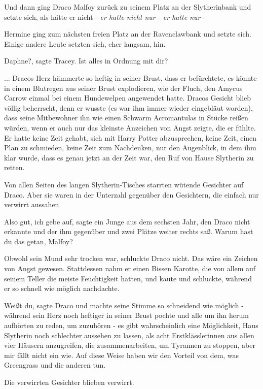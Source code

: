 Und dann ging Draco Malfoy zurück zu seinem Platz an der Slytherinbank und
setzte sich, als hätte er nicht -\emph{ er hatte nicht nur - er hatte nur} -

Hermine ging zum nächsten freien Platz an der Ravenclawbank und setzte sich.
Einige andere Leute setzten sich, eher langsam, hin.

\glqq{}Daphne?\grqq{}, sagte Tracey. \glqq{}Ist alles in Ordnung mit dir?\grqq{}

... Dracos Herz hämmerte so heftig in seiner Brust, dass er befürchtete, es
könnte in einem Blutregen aus seiner Brust explodieren, wie der Fluch, den
Amycus Carrow einmal bei einem Hundewelpen angewendet hatte. Dracos Gesicht
blieb völlig beherrscht, denn er wusste (es war ihm immer wieder eingebläut
worden), dass seine Mitbewohner ihn wie einen Schwarm Acromantulas in Stücke
reißen würden, wenn er auch nur das kleinste Anzeichen von Angst zeigte, die er
fühlte. Er hatte keine Zeit gehabt, sich mit Harry Potter abzusprechen, keine
Zeit, einen Plan zu schmieden, keine Zeit zum Nachdenken, nur den Augenblick, in
dem ihm klar wurde, dass es genau jetzt an der Zeit war, den Ruf von Hause
Slytherin zu retten.

Von allen Seiten des langen Slytherin-Tisches starrten wütende Gesichter auf
Draco. Aber sie waren in der Unterzahl gegenüber den Gesichtern, die einfach nur
verwirrt aussahen.

\glqq{}Also gut, ich gebe auf\grqq{}, sagte ein Junge aus dem sechsten Jahr, den
Draco nicht erkannte und der ihm gegenüber und zwei Plätze weiter rechts saß.
\glqq{}Warum hast du das getan, Malfoy?\grqq{}

Obwohl sein Mund sehr trocken war, schluckte Draco nicht. Das wäre ein Zeichen
von Angst gewesen. Stattdessen nahm er einen Bissen Karotte, die von allem auf
seinem Teller die meiste Feuchtigkeit hatten, und kaute und schluckte, während
er so schnell wie möglich nachdachte.

\glqq{}Weißt du\grqq{}, sagte Draco und machte seine Stimme so schneidend wie
möglich - während sein Herz noch heftiger in seiner Brust pochte und alle um ihn
herum aufhörten zu reden, um zuzuhören - \glqq{}es gibt wahrscheinlich eine
Möglichkeit, Haus Slytherin noch schlechter aussehen zu lassen, als acht
Erstklässlerinnen aus allen vier Häusern anzugreifen, die zusammenarbeiten, um
Tyrannen zu stoppen, aber mir fällt nicht ein wie. Auf diese Weise haben wir den
Vorteil von dem, was Greengrass und die anderen tun.\grqq{}

Die verwirrten Gesichter blieben verwirrt.

